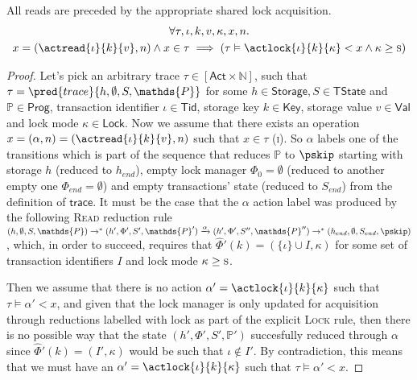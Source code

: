 \begin{lem}
	\label{lem:read}
	All reads are preceded by the appropriate shared lock acquisition.
	\begin{gather*}
	\forall \tau, \iota, k, v, \kappa, x, n \ldotp \\
	x = (\actread{\iota}{k}{v}, n) \land x \in \tau \implies \left( \tau \vDash \actlock{\iota}{k}{\kappa} < x \land \kappa \geq \textsc{s} \right)
	\end{gather*}
	
	\begin{proof}
	Let's pick an arbitrary trace $\tau \in [\mathsf{Act} \times \mathds{N}]$, such that $\tau = \pred{trace}{h, \emptyset, S, \mathds{P}}$ for some $h \in \mathsf{Storage}, S \in \mathsf{TState}$ and $\mathds{P} \in \mathsf{Prog}$, transaction identifier $\iota \in \mathsf{Tid}$, storage key $k \in \mathsf{Key}$, storage value $v \in \mathsf{Val}$ and lock mode $\kappa \in \mathsf{Lock}$. Now we assume that there exists an operation $x = (\alpha, n) = (\actread{\iota}{k}{v}, n)$ such that $x \in \tau$ (\textsc{i}). So $\alpha$ labels one of the transitions which is part of the sequence that reduces $\mathds{P}$ to $\pskip$ starting with storage $h$ (reduced to $h_{end}$), empty lock manager $\Phi_0 = \emptyset$ (reduced to another empty one $\Phi_{end} = \emptyset$) and empty transactions' state (reduced to $S_{end}$) from the definition of $\mathsf{trace}$. It must be the case that the $\alpha$ action label was produced by the following \textsc{Read} reduction rule $(h, \emptyset, S, \mathds{P}) \rightarrow^* (h', \Phi', S', \mathds{P}') \xrightarrow{\alpha} (h', \Phi', S'', \mathds{P}'') \rightarrow^* (h_{end}, \emptyset, S_{end}, \pskip)$, which, in order to succeed, requires that $\hat{\Phi}'(k) = (\{ \iota \} \cup I, \kappa)$ for some set of transaction identifiers $I$ and lock mode $\kappa \geq \textsc{s}$.
	
	Then we assume that there is no action $\alpha' = \actlock{\iota}{k}{\kappa}$ such that $\tau \vDash \alpha' < x$, and given that the lock manager is only updated for acquisition through reductions labelled with \textsf{lock} as part of the explicit \textsc{Lock} rule, then there is no possible way that the state $(h', \Phi', S', \mathds{P}')$ succesfully reduced through $\alpha$ since $\hat{\Phi}'(k) = (I'
	, \kappa)$ would be such that $\iota \not\in I'$. By contradiction, this means that we must have an $\alpha' = \actlock{\iota}{k}{\kappa}$ such that $\tau \vDash \alpha' < x$.
	\end{proof}
\end{lem}


